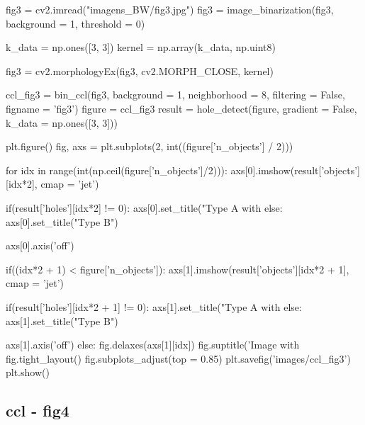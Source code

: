 \documentclass{article}
\begin{document}
\begin{python}
fig3 = cv2.imread("imagens_BW/fig3.jpg")
fig3 = image_binarization(fig3, background = 1, threshold = 0)

k_data = np.ones([3, 3])
kernel = np.array(k_data, np.uint8)

fig3 = cv2.morphologyEx(fig3, cv2.MORPH_CLOSE, kernel)

ccl_fig3 = bin_ccl(fig3, background = 1, neighborhood = 8, filtering = False, figname = 'fig3')
figure = ccl_fig3
result = hole_detect(figure, gradient = False, k_data = np.ones([3, 3]))

plt.figure()
fig, axs = plt.subplots(2, int((figure['n_objects'] / 2)))

for idx in range(int(np.ceil(figure['n_objects']/2))):
	axs[0].imshow(result['objects'][idx*2], cmap = 'jet')
	
	if(result['holes'][idx*2] != 0):
		axs[0].set_title("Type A with %
	else:
		axs[0].set_title("Type B")
	
	axs[0].axis('off')
	
	if((idx*2 + 1) < figure['n_objects']):
		axs[1].imshow(result['objects'][idx*2 + 1], cmap = 'jet')
		
		if(result['holes'][idx*2 + 1] != 0):
			axs[1].set_title("Type A with %
		else:
			axs[1].set_title("Type B")        
	
		axs[1].axis('off')
	else:
		fig.delaxes(axs[1][idx])
fig.suptitle('Image with %
fig.tight_layout()
fig.subplots_adjust(top = 0.85)
plt.savefig('images/ccl_fig3')
plt.show()
\end{python}

\newpage
\subsection{ccl - fig4}
\label{cod:ccl_fig4}
\end{document}
